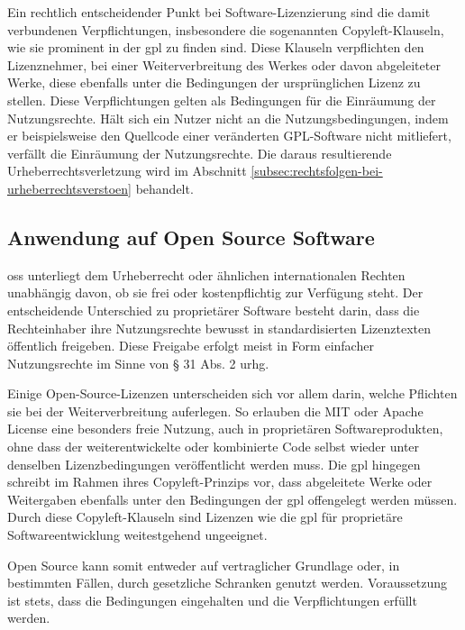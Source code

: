 Ein rechtlich entscheidender Punkt bei Software-Lizenzierung sind die damit verbundenen Verpflichtungen, insbesondere die sogenannten Copyleft-Klauseln, wie sie prominent in der \gls{gpl} zu finden sind.
Diese Klauseln verpflichten den Lizenznehmer, bei einer Weiterverbreitung des Werkes oder davon abgeleiteter Werke, diese ebenfalls unter die Bedingungen der ursprünglichen Lizenz zu stellen.
Diese Verpflichtungen gelten als Bedingungen für die Einräumung der Nutzungsrechte.
Hält sich ein Nutzer nicht an die Nutzungsbedingungen, indem er beispielsweise den Quellcode einer veränderten GPL-Software nicht mitliefert, verfällt die Einräumung der Nutzungsrechte.
Die daraus resultierende Urheberrechtsverletzung wird im Abschnitt \ref{subsec:rechtsfolgen-bei-urheberrechtsverstoen} behandelt.


\subsection{Anwendung auf Open Source Software}

\gls{oss} unterliegt dem Urheberrecht oder ähnlichen internationalen Rechten unabhängig davon, ob sie frei oder kostenpflichtig zur Verfügung steht.
Der entscheidende Unterschied zu proprietärer Software besteht darin, dass die Rechteinhaber ihre Nutzungsrechte bewusst in standardisierten Lizenztexten öffentlich freigeben.
Diese Freigabe erfolgt meist in Form einfacher Nutzungsrechte im Sinne von § 31 Abs. 2 \gls{urhg}.

Einige Open-Source-Lizenzen unterscheiden sich vor allem darin, welche Pflichten sie bei der Weiterverbreitung auferlegen.
So erlauben die MIT oder Apache License eine besonders freie Nutzung, auch in proprietären Softwareprodukten, ohne dass der weiterentwickelte oder kombinierte Code selbst wieder unter denselben Lizenzbedingungen veröffentlicht werden muss.
Die \gls{gpl} hingegen schreibt im Rahmen ihres Copyleft-Prinzips vor, dass abgeleitete Werke oder Weitergaben ebenfalls unter den Bedingungen der \gls{gpl} offengelegt werden müssen.
Durch diese Copyleft-Klauseln sind Lizenzen wie die \gls{gpl} für proprietäre Softwareentwicklung weitestgehend ungeeignet.

Open Source kann somit entweder auf vertraglicher Grundlage oder, in bestimmten Fällen, durch gesetzliche Schranken genutzt werden.
Voraussetzung ist stets, dass die Bedingungen eingehalten und die Verpflichtungen erfüllt werden.

